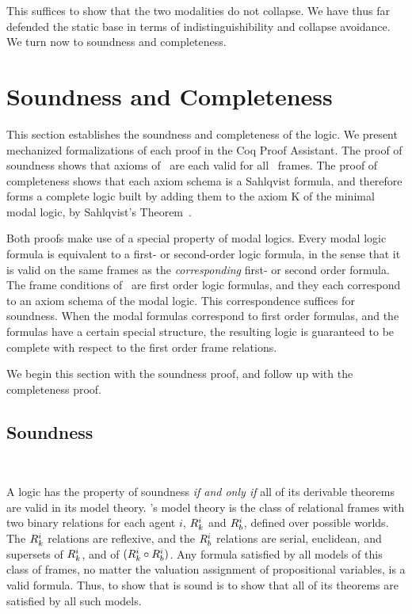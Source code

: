 This suffices to show that the two modalities do not collapse. We have thus far defended the static base in terms of indistinguishibility and collapse avoidance. We turn now to soundness and completeness.

\section{Soundness and Completeness}

This section establishes the soundness and completeness of the logic.  We present mechanized formalizations of each proof in the Coq Proof Assistant. The proof of soundness shows that axioms of \DASL\ are each valid for all \DASL\ frames. The proof of completeness shows that each axiom schema is a Sahlqvist formula, and therefore forms a complete logic built by adding them to the axiom K of the minimal modal logic, by Sahlqvist's Theorem~\cite{sahlqvist}.

Both proofs make use of a special property of modal logics. Every modal logic formula is equivalent to a first- or second-order logic formula, in the sense that it is valid on the same frames as the \emph{corresponding} first- or second order formula. The frame conditions of \DASL\ are first order logic formulas, and they each correspond to an axiom schema of the modal logic. This correspondence suffices for soundness. When the modal formulas correspond to first order formulas, and the formulas have a certain special structure, the resulting logic is guaranteed to be complete with respect to the first order frame relations.

We begin this section with the soundness proof, and follow up with the completeness proof. 

\subsection{Soundness}~\label{sec:soundness}

A logic has the property of soundness \emph{if and only if} all of its derivable theorems are valid in its model theory. \DASL's model theory is the class of relational frames with two binary relations for each agent $i$, $R_{k}^i$ and $R_{b}^i$, defined over possible worlds. The $R_{k}^i$ relations are reflexive, and the $R_{b}^i$ relations are serial, euclidean, and supersets of $R_{k}^i$, and of $(R_{k}^i \circ R_{b}^i)$. Any formula satisfied by all models of this class of frames, no matter the valuation assignment of propositional variables, is a valid formula. Thus, to show that \DASL is sound is to show that all of its theorems are satisfied by all such models.

